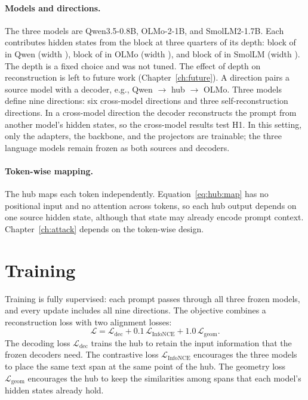 \paragraph{Models and directions.} The three models are Qwen3.5-0.8B, OLMo-2-1B, and SmolLM2-1.7B.
Each contributes hidden states from the block at three quarters of its depth: block  of  in Qwen (width ), block  of  in OLMo (width ), and block  of  in SmolLM (width ). %
The depth is a fixed choice and was not tuned.
The effect of depth on reconstruction is left to future work (Chapter~\ref{ch:future}).
A direction pairs a source model with a decoder, e.g., Qwen $\to$ hub $\to$ OLMo.
Three models define nine directions: six cross-model directions and three self-reconstruction directions.
In a cross-model direction the decoder reconstructs the prompt from another model's hidden states, so the cross-model results test H1.
In this setting, only the adapters, the backbone, and the projectors are trainable; the three language models remain frozen as both sources and decoders.

\paragraph{Token-wise mapping.} The hub maps each token independently.
Equation~\ref{eq:hub:map} has no positional input and no attention across tokens, so each hub output depends on one source hidden state, although that state may already encode prompt context.
Chapter~\ref{ch:attack} depends on the token-wise design.

\section{Training}\label{sec:hub:training}

Training is fully supervised: each prompt passes through all three frozen models, and every update includes all nine directions.
The objective combines a reconstruction loss with two alignment losses:
\begin{equation}
\mathcal{L} = \mathcal{L}_{\text{dec}} + 0.1\,\mathcal{L}_{\text{InfoNCE}} + 1.0\,\mathcal{L}_{\text{geom}} .
\label{eq:hub:loss}
\end{equation}
The decoding loss $\mathcal{L}_{\text{dec}}$ trains the hub to retain the input information that the frozen decoders need.
The contrastive loss $\mathcal{L}_{\text{InfoNCE}}$ encourages the three models to place the same text span at the same point of the hub.
The geometry loss $\mathcal{L}_{\text{geom}}$ encourages the hub to keep the similarities among spans that each model's hidden states already hold.

